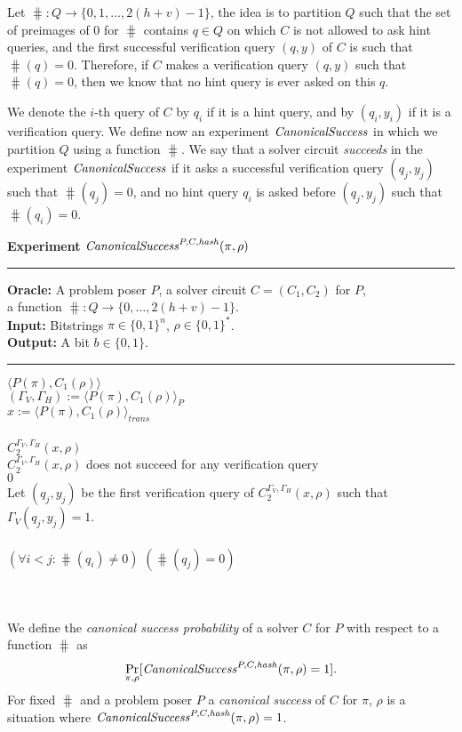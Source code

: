 %

Let $\hash:Q\rightarrow\{0,1,\dots, 2(h+v)-1\}$, the idea is to partition $Q$ such that the set of preimages
of $0$ for $\hash$ contains $q \in Q$ on which $C$ is not allowed to ask hint queries,
and the first successful verification query $(q,y)$ of $C$ is such that $\hash(q) = 0$.
Therefore, if $C$ makes a verification query $(q,y)$ such that $\hash(q) = 0$, then we know that no hint query is ever asked on this $q$.

We denote the $i$-th query of $C$ by $q_i$ if it is a hint query, and by $(q_i, y_i)$ if it is a verification query.
We define now an experiment $\operatorname{\mathit{CanonicalSuccess}}$ in which we partition $Q$ using a function $\hash$.
We say that a solver circuit \textit{succeeds} in the experiment $\operatorname{\mathit{CanonicalSuccess}}$
if it asks a successful verification query $(q_j, y_j)$ such that $\hash(q_j) = 0$,
and no hint query $q_i$ is asked before $(q_j, y_j)$ such that $\hash(q_i) = 0$.
%
\begin{codeblock}
  \textbf{Experiment} $\operatorname{\mathit{CanonicalSuccess}}^{P, C, \operatorname{\mathit{hash}}}(\pi, \rho)$
  \medskip \hrule \medskip
  \textbf{Oracle:} A problem poser $P$, a solver circuit $C = (C_1, C_2)$ for $P$,\\
  \IndII a function $\hash: Q \rightarrow \{0, \dots, 2(h+v) - 1\}$.\\
  \textbf{Input:}  Bitstrings $\pi \in \{0,1\}^n$, $\rho \in \{0,1\}^*$. \\
  \textbf{Output:} A bit $b \in \{0,1\}$.

  \medskip\hrule\medskip
  \Run $\langle P(\pi), C_1(\rho) \rangle$ \\
  \IndI $(\Gamma_V, \Gamma_H) := \langle P(\pi), C_1(\rho) \rangle_{P}$ \\
  \IndI $x := \langle P(\pi), C_1(\rho) \rangle_{\mathit{trans}}$ \\ \\
  \Run $C_2^{\Gamma_V, \Gamma_H} (x, \rho)$ \\
  \IndI \If $C_2^{\Gamma_V, \Gamma_H} (x, \rho)$ does not succeed for any verification query \Then \\
  \IndII \Return $0$ \\
  \IndI Let $(q_j,y_j)$ be the first verification query of $C_2^{\Gamma_V, \Gamma_H} (x, \rho)$ such that $\Gamma_V(q_j, y_j) = 1$.\\
  \\
  \If $(\forall i < j :  \hash(q_i) \neq 0)$ \And $(\hash(q_j) = 0)$ \Then \\
  \IndI {}\\
  \Else\\
  \IndI {}
\end{codeblock}
%
We define the \textit{canonical success probability} of a solver $C$ for $P$ with respect to a function $\hash$ as
\begin{align}
 \underset{\pi, \rho}{\Pr}[\operatorname{\mathit{CanonicalSuccess}}^{P, C, \operatorname{\mathit{hash}}}(\pi, \rho) = 1].
\end{align}
%
For fixed $\hash$ and a problem poser $P$ a \textit{canonical success} of $C$ for $\pi$, $\rho$ is a situation where
$\operatorname{\mathit{CanonicalSuccess}}^{P, C, \operatorname{\mathit{hash}}}(\pi, \rho) = 1$.

